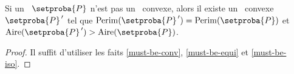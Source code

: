 \begin{fact} \label{must-be-reg}
	Si un \ngone\ $\setproba{P}$ n'est pas un \nreg\ convexe,
	alors il existe un \ngone\ convexe $\primeit{\setproba{P}}$ tel que
	$\perim{\primeit{\setproba{P}}} = \perim{\setproba{P}}$
	et
	$\area{\primeit{\setproba{P}}} > \area{\setproba{P}}$.
\end{fact}


\begin{proof}
	Il suffit d'utiliser les faits \ref{must-be-conv}, \ref{must-be-equi} et \ref{must-be-iso}.
\end{proof}


%
%
%
%
%
%
%
%	
%

